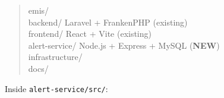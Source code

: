 \documentclass[11pt]{article}
\begin{document}
\begin{quote}
\small\ttfamily
emis/ \\
\hspace*{1em}backend/\hspace{2.5cm} Laravel + FrankenPHP (existing) \\
\hspace*{1em}frontend/\hspace{2.4cm} React + Vite (existing) \\
\hspace*{1em}alert-service/\hspace{1.6cm} Node.js + Express + MySQL (\textbf{NEW}) \\
\hspace*{1em}infrastructure/ \\
\hspace*{1em}docs/
\end{quote}

Inside \texttt{alert-service/src/}:
\end{document}
